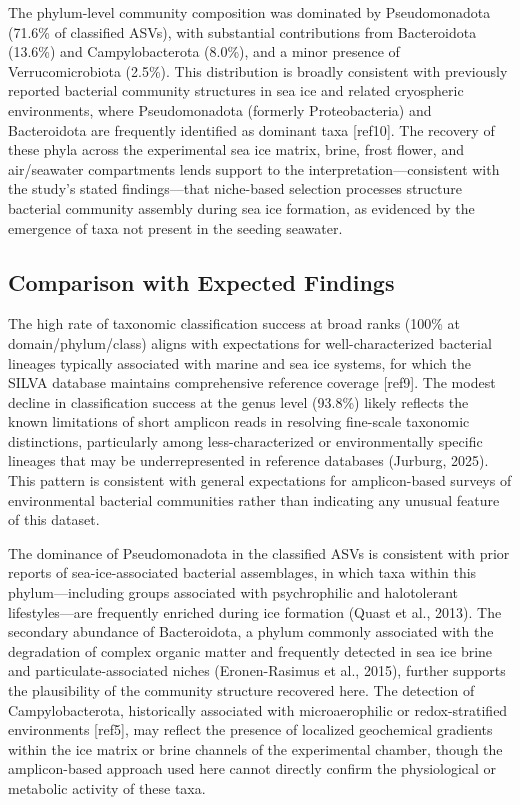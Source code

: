 \documentclass[
  11pt,
]{article}
\begin{document}
The phylum-level community composition was dominated by Pseudomonadota
(71.6\% of classified ASVs), with substantial contributions from
Bacteroidota (13.6\%) and Campylobacterota (8.0\%), and a minor presence
of Verrucomicrobiota (2.5\%). This distribution is broadly consistent
with previously reported bacterial community structures in sea ice and
related cryospheric environments, where Pseudomonadota (formerly
Proteobacteria) and Bacteroidota are frequently identified as dominant
taxa {[}ref10{]}. The recovery of these phyla across the experimental
sea ice matrix, brine, frost flower, and air/seawater compartments lends
support to the interpretation---consistent with the study's stated
findings---that niche-based selection processes structure bacterial
community assembly during sea ice formation, as evidenced by the
emergence of taxa not present in the seeding seawater.

\subsection{Comparison with Expected
Findings}\label{comparison-with-expected-findings}

The high rate of taxonomic classification success at broad ranks (100\%
at domain/phylum/class) aligns with expectations for well-characterized
bacterial lineages typically associated with marine and sea ice systems,
for which the SILVA database maintains comprehensive reference coverage
{[}ref9{]}. The modest decline in classification success at the genus
level (93.8\%) likely reflects the known limitations of short amplicon
reads in resolving fine-scale taxonomic distinctions, particularly among
less-characterized or environmentally specific lineages that may be
underrepresented in reference databases (Jurburg, 2025). This pattern is
consistent with general expectations for amplicon-based surveys of
environmental bacterial communities rather than indicating any unusual
feature of this dataset.

The dominance of Pseudomonadota in the classified ASVs is consistent
with prior reports of sea-ice-associated bacterial assemblages, in which
taxa within this phylum---including groups associated with psychrophilic
and halotolerant lifestyles---are frequently enriched during ice
formation (Quast et al., 2013). The secondary abundance of Bacteroidota,
a phylum commonly associated with the degradation of complex organic
matter and frequently detected in sea ice brine and
particulate-associated niches (Eronen-Rasimus et al., 2015), further
supports the plausibility of the community structure recovered here. The
detection of Campylobacterota, historically associated with
microaerophilic or redox-stratified environments {[}ref5{]}, may reflect
the presence of localized geochemical gradients within the ice matrix or
brine channels of the experimental chamber, though the amplicon-based
approach used here cannot directly confirm the physiological or
metabolic activity of these taxa.
\end{document}
